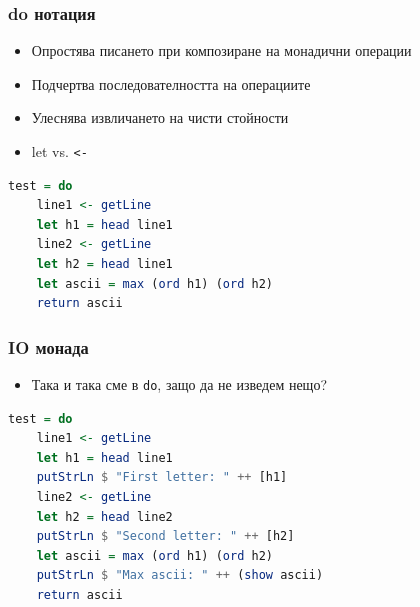 \documentclass{beamer}
\begin{document}
\begin{frame}[fragile]
  \frametitle{do нотация}
\begin{itemize}
  \item Опростява писането при композиране на монадични операции
  \item Подчертва последователността на операциите
  \item Улеснява извличането на чисти стойности
  \item let vs. \verb#<-#
\end{itemize}
\begin{lstlisting}[basicstyle=\small,language=Haskell]
test = do
    line1 <- getLine
    let h1 = head line1
    line2 <- getLine
    let h2 = head line1
    let ascii = max (ord h1) (ord h2)
    return ascii
\end{lstlisting}
\end{frame}

\begin{frame}[fragile]
  \frametitle{IO монада}
\begin{itemize}
  \item Така и така сме в \verb#do#, защо да не изведем нещо?
\end{itemize}
\begin{lstlisting}[basicstyle=\small,language=Haskell]
test = do
    line1 <- getLine
    let h1 = head line1
    putStrLn $ "First letter: " ++ [h1]
    line2 <- getLine
    let h2 = head line2
    putStrLn $ "Second letter: " ++ [h2]
    let ascii = max (ord h1) (ord h2)
    putStrLn $ "Max ascii: " ++ (show ascii)
    return ascii
\end{lstlisting}
\end{frame}







\end{document}
